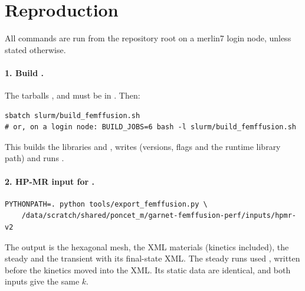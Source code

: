\section{Reproduction}
\label{sec:reproduction}

All commands are run from the \garnet{} repository root on a merlin7 login
node, unless stated otherwise.

\paragraph{1. Build \ffn{}.} The tarballs , 
and  must be in
. Then:
\begin{verbatim}
sbatch slurm/build_femffusion.sh
# or, on a login node: BUILD_JOBS=6 bash -l slurm/build_femffusion.sh
\end{verbatim}
This builds the libraries and ,
writes  (versions, flags and the runtime library path)
and runs .

\paragraph{2. HP-MR input for \ffn{}.}
\begin{verbatim}
PYTHONPATH=. python tools/export_femffusion.py \
    /data/scratch/shared/poncet_m/garnet-femffusion-perf/inputs/hpmr-v2
\end{verbatim}
The output is the hexagonal mesh, the XML materials (kinetics included), the
steady  and the transient \code{.prm} with its final-state XML. The
steady runs used \code{hpmr-v1}, written before the kinetics moved into the
XML. Its static data are identical, and both inputs give the same $k$.

